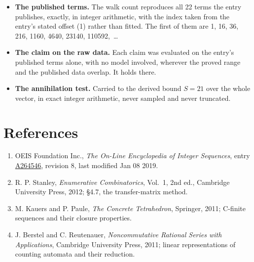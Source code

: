 \documentclass[11pt]{article}
\theoremstyle{definition}
\begin{document}
\begin{itemize}

\item {\bfseries The published terms.} The walk count reproduces all 22 terms the entry publishes, exactly, in integer arithmetic, with the index taken from the entry's stated offset (1) rather than fitted. The first of them are 1, 16, 36, 216, 1160, 4640, 23140, 110592,~\dots

\item {\bfseries The claim on the raw data.} Each claim was evaluated on the entry's published terms alone, with no model involved, wherever the proved range and the published data overlap. It holds there.

\item {\bfseries The annihilation test.} Carried to the derived bound $S = 21$ over the whole vector, in exact integer arithmetic, never sampled and never truncated.

\end{itemize}

\section{References}

\begin{enumerate}

\item OEIS Foundation Inc., \emph{The On-Line Encyclopedia of Integer Sequences}, entry \href{https://oeis.org/A264546}{A264546}, revision 8, last modified Jan 08 2019.

\item R. P. Stanley, \emph{Enumerative Combinatorics}, Vol.~1, 2nd ed., Cambridge University Press, 2012; \S4.7, the transfer-matrix method.

\item M. Kauers and P. Paule, \emph{The Concrete Tetrahedron}, Springer, 2011; C-finite sequences and their closure properties.

\item J. Berstel and C. Reutenauer, \emph{Noncommutative Rational Series with Applications}, Cambridge University Press, 2011; linear representations of counting automata and their reduction.

\end{enumerate}
\end{document}
